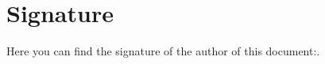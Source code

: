 \section{Signature}
\label{sec:signature}

Here you can find the signature of the author of this document:.